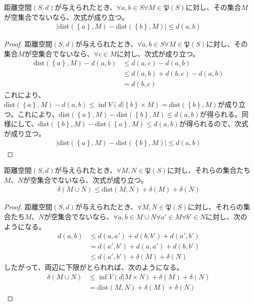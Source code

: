 \documentclass[dvipdfmx]{jsarticle}
\begin{document}
\begin{thm}\label{8.2.3.6}
距離空間$(S,d)$が与えられたとき、$\forall a,b \in S\forall M \in \mathfrak{P}(S)$に対し、その集合$M$が空集合でないなら、次式が成り立つ。
\begin{align*}
\left| \mathrm{dist}\left( \left\{ a \right\},M \right) - \mathrm{dist}\left( \left\{ b \right\},M \right) \right| \leq d(a,b)
\end{align*}
\end{thm}
\begin{proof}
距離空間$(S,d)$が与えられたとき、$\forall a,b \in S\forall M \in \mathfrak{P}(S)$に対し、その集合$M$が空集合でないなら、$\forall c \in M$に対し、次式が成り立つ。
\begin{align*}
\mathrm{dist}\left( \left\{ a \right\},M \right) - d(a,b) &\leq d(a,c) - d(a,b)\\
&\leq d(a,b) + d(b,c) - d(a,b)\\
&= d(b,c)
\end{align*}
これにより、$\mathrm{dist}\left( \left\{ a \right\},M \right) - d(a,b) \leq \inf{V\left( d|\left\{ b \right\} \times M \right)} = \mathrm{dist}\left( \left\{ b \right\},M \right)$が成り立つ。これにより、$\mathrm{dist}\left( \left\{ a \right\},M \right) - \mathrm{dist}\left( \left\{ b \right\},M \right) \leq d(a,b)$が得られる。同様にして、$\mathrm{dist}\left( \left\{ b \right\},M \right) - \mathrm{dist}\left( \left\{ a \right\},M \right) \leq d(a,b)$が得られるので、次式が成り立つ。
\begin{align*}
\left| \mathrm{dist}\left( \left\{ a \right\},M \right) - \mathrm{dist}\left( \left\{ b \right\},M \right) \right| \leq d(a,b)
\end{align*}
\end{proof}
\begin{thm}\label{8.2.3.7}
距離空間$(S,d)$が与えられたとき、$\forall M,N \in \mathfrak{P}(S)$に対し、それらの集合たち$M$、$N$が空集合でないなら、次式が成り立つ。
\begin{align*}
\delta(M \cup N) \leq \mathrm{dist}(M,N) + \delta(M) + \delta(N)
\end{align*}
\end{thm}
\begin{proof}
距離空間$(S,d)$が与えられたとき、$\forall M,N \in \mathfrak{P}(S)$に対し、それらの集合たち$M$、$N$が空集合でないなら、$\forall a,b \in M \cup N\forall a' \in M\forall b' \in N$に対し、次のようになる。
\begin{align*}
d(a,b) &\leq d\left( a,a' \right) + d\left( b,b' \right) + d\left( a',b' \right)\\
&= d\left( a',b' \right) + d\left( a,a' \right) + d\left( b,b' \right)\\
&\leq d\left( a',b' \right) + \delta(M) + \delta(N)
\end{align*}
したがって、両辺に下限がとられれば、次のようになる。
\begin{align*}
\delta(M \cup N) &\leq \inf{V\left( d|M \times N \right)} + \delta(M) + \delta(N)\\
&= \mathrm{dist}(M,N) + \delta(M) + \delta(N)
\end{align*}
\end{proof}
\end{document}
